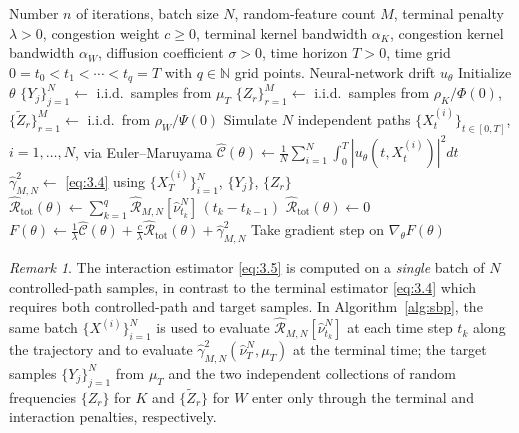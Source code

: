 \documentclass[11pt,leqno]{article}
\theoremstyle{plain}
\theoremstyle{remark}
\newtheorem{rem}[thm]{Remark}
\theoremstyle{definition}
\numberwithin{equation}{section}
\numberwithin{figure}{section}
\numberwithin{table}{section}
\numberwithin{algorithm}{section}
\begin{document}
\begin{algorithm}
\caption{Potential MFG with kernel costs via RF $U$-statistic estimators}
\label{alg:sbp}
\begin{algorithmic}[1]
\Input Number $n$ of iterations, batch size $N$, random-feature count $M$,
terminal penalty $\lambda>0$, congestion weight $c\ge 0$,
terminal kernel bandwidth $\alpha_K$, congestion kernel bandwidth $\alpha_W$,
diffusion coefficient $\sigma>0$, time horizon $T>0$,
time grid $0=t_0<t_1<\cdots<t_q=T$ with $q\in\mathbb{N}$ grid points.
\Output Neural-network drift $u_\theta$
\State Initialize $\theta$
      \State $\{Y_j\}_{j=1}^N \gets$ i.i.d.\ samples from $\mu_T$
      \State $\{Z_r\}_{r=1}^M \gets$ i.i.d.\ samples from $\rho_K/\Phi(0)$, $\{\tilde Z_r\}_{r=1}^M \gets$ i.i.d.\ from $\rho_W/\Psi(0)$
      \State Simulate $N$ independent paths $\{X_t^{(i)}\}_{t\in[0,T]}$, $i=1,\ldots,N$, via Euler--Maruyama
      \State $\hat{\mathcal{C}}(\theta) \gets \frac{1}{N}\sum_{i=1}^N \int_0^T|u_\theta(t,X_t^{(i)})|^2dt$
      \State $\hat{\gamma}_{M,N}^2 \gets$ \eqref{eq:3.4} using $\{X_T^{(i)}\}_{i=1}^N$, $\{Y_j\}$, $\{Z_r\}$
        \State $\hat{\mathcal{R}}_{\mathrm{tot}}(\theta) \gets \sum_{k=1}^{q}\hat{\mathcal{R}}_{M,N}[\hat\nu^N_{t_k}]\,(t_k - t_{k-1})$
      \Else
        \State $\hat{\mathcal{R}}_{\mathrm{tot}}(\theta) \gets 0$
      \EndIf
      \State $F(\theta) \gets \frac{1}{\lambda}\hat{\mathcal{C}}(\theta) + \frac{c}{\lambda}\hat{\mathcal{R}}_{\mathrm{tot}}(\theta) + \hat{\gamma}_{M,N}^2$
      \State Take gradient step on $\nabla_\theta F(\theta)$
\EndFor
\end{algorithmic}
\end{algorithm}

\begin{rem}\label{rem:3.interaction}
The interaction estimator \eqref{eq:3.5} is computed on a \emph{single} batch of $N$ controlled-path samples,
in contrast to the terminal estimator \eqref{eq:3.4} which requires both controlled-path and target samples.
In Algorithm~\ref{alg:sbp}, the same batch $\{X^{(i)}\}_{i=1}^N$
is used to evaluate $\hat{\mathcal{R}}_{M,N}[\hat\nu^N_{t_k}]$ at each time step $t_k$ along the trajectory
and to evaluate $\hat\gamma_{M,N}^2(\hat\nu^N_T,\mu_T)$ at the terminal time;
the target samples $\{Y_j\}_{j=1}^N$ from $\mu_T$ and the two independent collections of random frequencies
$\{Z_r\}$ for $K$ and $\{\tilde Z_r\}$ for $W$ enter only through the terminal and interaction penalties, respectively.
\end{rem}
\end{document}
